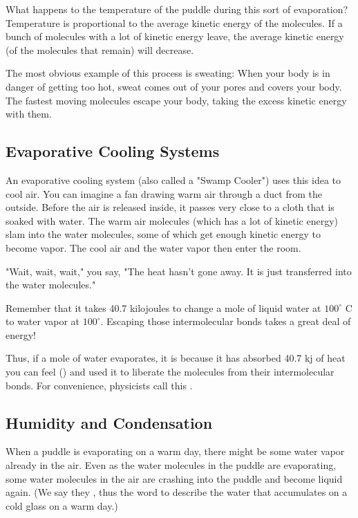 What happens to the temperature of the puddle during this sort of evaporation? Temperature is proportional to the average kinetic energy of the molecules. If a bunch of molecules with a lot of kinetic energy leave, the average kinetic energy (of the molecules that remain) will decrease.

The most obvious example of this process is sweating: When your body is in danger of getting too hot, sweat comes out of your pores and covers your body. The fastest moving molecules escape your body, taking the excess kinetic energy with them.

\subsection{Evaporative Cooling Systems}

An evaporative cooling system (also called a "Swamp Cooler") uses this idea to cool air. You can imagine a fan drawing warm air through a duct from the outside.  Before the air is released inside, it passes very close to a cloth that is soaked with water.  The warm air molecules (which has a lot of kinetic energy) slam into the water molecules, some of which get enough kinetic energy to become vapor. The cool air and the water vapor then enter the room.

"Wait, wait, wait," you say, "The heat hasn't gone away. It is just transferred into the water molecules."

Remember that it takes 40.7 kilojoules to change a mole of liquid water at $100^\circ$ C to water vapor at $100^\circ$. Escaping those intermolecular bonds takes a great deal of energy!

Thus, if a mole of water evaporates,  it is because it has absorbed 40.7 kj of heat you can feel
 () and used it to liberate the molecules from their intermolecular bonds. For
 convenience, physicists call this .
 
 \subsection{Humidity and Condensation}
 
When a puddle is evaporating on a warm day, there might be some water vapor already in the air. Even as the water molecules in the puddle are evaporating, some water molecules in the air are crashing into the puddle and become liquid again. (We say they , thus the word  to describe the water that accumulates on a cold glass on a warm day.)
 
